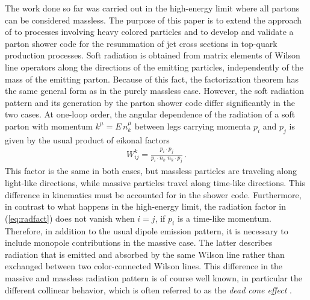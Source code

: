 \documentclass[11pt,a4paper]{article}
\begin{document}
The work done so far was carried out in the high-energy limit where all partons can be considered massless. The purpose of this paper is to extend the approach of \cite{Becher:2015hka,Becher:2016mmh,Balsiger:2018ezi,Balsiger:2019tne} to processes involving heavy colored particles and to develop and validate a  parton shower code  for the resummation of jet cross sections in top-quark production processes. Soft radiation is obtained from matrix elements of Wilson line operators along the directions of the emitting particles, independently of the mass of the emitting parton. Because of this fact, the factorization theorem has the same general form as in the purely massless case. However, the soft radiation pattern and its generation by the parton shower code differ significantly in the two cases. At one-loop order, the angular dependence of the radiation of a soft parton with momentum $k^\mu = E\, n_k^\mu$ between legs carrying momenta $p_i$ and $p_j$ is given by the usual product of eikonal factors
\begin{align}
W_{ij}^k=\frac{p_i \cdot p_j}{p_i\cdot n_k \,\, n_k\cdot p_j} \label{eq:radfact} \, . 
\end{align}
This factor is the same in both cases, but massless particles are traveling along light-like directions, while massive particles travel along time-like directions. This difference in kinematics must be accounted for in the shower code.  Furthermore,  in contrast to what happens in the high-energy limit, the radiation factor in (\ref{eq:radfact}) does not vanish when $i=j$,  if $p_i$ is a time-like momentum. Therefore, in addition to the usual dipole emission pattern, it is necessary to include monopole contributions in the massive case. The latter describes radiation  that is emitted and absorbed by the same Wilson line rather than exchanged between two color-connected Wilson lines. This difference in the massive and massless radiation pattern is of course well known, in particular the different collinear behavior, which is often referred to as the {\em dead cone effect} \cite{Dokshitzer:1991fc,Dokshitzer:1991fd,Ellis:1991qj,Maltoni:2016ays}.
\end{document}
